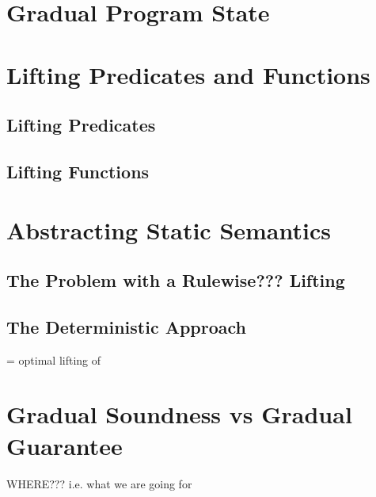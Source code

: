 \section{Gradual Program State}
\label{sec:gradual-program-state}


\section{Lifting Predicates and Functions}
\label{sec:lifting-predicates-and}


    \subsection{Lifting Predicates}
    \label{ssec:lifting-predicates}
    
    
    \subsection{Lifting Functions}
    \label{ssec:lifting-functions}
    
    
\section{Abstracting Static Semantics}
\label{sec:abstracting-static-semantics}

    
    \subsection{The Problem with a Rulewise??? Lifting}
    \label{ssec:the-problem-with}
    
    
    \subsection{The Deterministic Approach}
    \label{ssec:the-deterministic-approach}
    
    
    \grad{\wsp} = optimal lifting of \wsp

\section{Gradual Soundness vs Gradual Guarantee}
\label{ssec:gradual-soundness}

WHERE???
i.e. what we are going for

